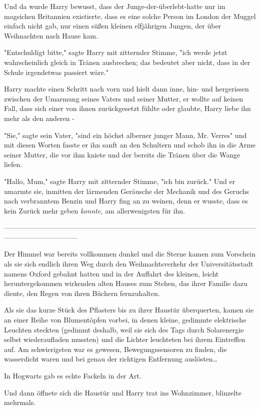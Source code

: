 {Und da wurde Harry bewusst, dass der Junge-der-überlebt-hatte nur im magsichen Britannien existierte, dass es eine solche Person im London der Muggel einfach nicht gab, nur einen süßen kleinen elfjährigen Jungen, der über Weihnachten nach Hause kam.

"Entschuldigt bitte," sagte Harry mit zitternder Stimme, "ich werde jetzt wahrscheinlich gleich in Tränen ausbrechen; das bedeutet aber nicht, dass in der Schule irgendetwas passiert wäre."

Harry machte einen Schritt nach vorn und hielt dann inne, hin- und hergerissen zwischen der Umarmung seines Vaters und seiner Mutter, er wollte auf keinen Fall, dass sich einer von ihnen zurückgesetzt fühlte oder glaubte, Harry liebe ihn mehr als den anderen -

"Sie," sagte sein Vater, "sind ein höchst alberner junger Mann, Mr. Verres" und mit diesen Worten fasste er ihn sanft an den Schultern und schob ihn in die Arme seiner Mutter, die vor ihm kniete und der bereits die Tränen über die Wange liefen.

"Hallo, Mum," sagte Harry mit zitternder Stimme, "ich bin zurück." Und er umarmte sie, inmitten der lärmenden Geräusche der Mechanik und des Geruchs nach verbranntem Benzin und Harry fing an zu weinen, denn er wusste, dass es kein Zurück mehr geben \emph{konnte,} am allerwenigsten für ihn.

--------------------------------------------------------------------------------------------------------------------------------------------

Der Himmel war bereits vollkommen dunkel und die Sterne kamen zum Vorschein als sie sich endlich ihren Weg durch den Weihnachtsverkehr der Universitätsstadt namens Oxford gebahnt hatten und in der Auffahrt des kleinen, leicht heruntergekommen wirkenden alten Hauses zum Stehen, das ihrer Familie dazu diente, den Regen von ihren Büchern fernzuhalten.

Als sie das kurze Stück des Pflasters bis zu ihrer Haustür überquerten, kamen sie an einer Reihe von Blumentöpfen vorbei, in denen kleine, gedimmte elektrische Leuchten steckten (gedimmt deshalb, weil sie sich des Tags durch Solarenergie selbst wiederaufladen mussten) und die Lichter leuchteten bei ihrem Eintreffen auf. Am schwierigsten war es gewesen, Bewegungssensoren zu finden, die wasserdicht waren und bei genau der richtigen Entfernung auslösten…

In Hogwarts gab es echte Fackeln in der Art.

Und dann öffnete sich die Haustür und Harry trat ins Wohnzimmer, blinzelte mehrmals.

}
